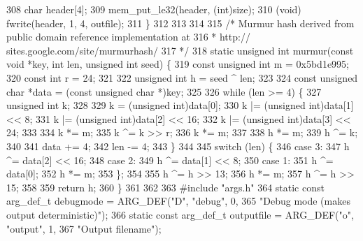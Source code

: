\begin{DoxyCodeInclude}
{{308   \textcolor{keywordtype}{char}             header[4];
309   mem\_put\_le32(header, (\textcolor{keywordtype}{int})size);
310   (void) fwrite(header, 1, 4, outfile);
311 \}
312 
313 
314 
315 \textcolor{comment}{/* Murmur hash derived from public domain reference implementation at}
316 \textcolor{comment}{ *   http:// sites.google.com/site/murmurhash/}
317 \textcolor{comment}{ */}
318 \textcolor{keyword}{static} \textcolor{keywordtype}{unsigned} \textcolor{keywordtype}{int} murmur(\textcolor{keyword}{const} \textcolor{keywordtype}{void} *key, \textcolor{keywordtype}{int} len, \textcolor{keywordtype}{unsigned} \textcolor{keywordtype}{int} seed) \{
319   \textcolor{keyword}{const} \textcolor{keywordtype}{unsigned} \textcolor{keywordtype}{int} m = 0x5bd1e995;
320   \textcolor{keyword}{const} \textcolor{keywordtype}{int} r = 24;
321 
322   \textcolor{keywordtype}{unsigned} \textcolor{keywordtype}{int} h = seed ^ len;
323 
324   \textcolor{keyword}{const} \textcolor{keywordtype}{unsigned} \textcolor{keywordtype}{char} *data = (\textcolor{keyword}{const} \textcolor{keywordtype}{unsigned} \textcolor{keywordtype}{char} *)key;
325 
326   \textcolor{keywordflow}{while} (len >= 4) \{
327     \textcolor{keywordtype}{unsigned} \textcolor{keywordtype}{int} k;
328 
329     k  = (\textcolor{keywordtype}{unsigned} int)data[0];
330     k |= (\textcolor{keywordtype}{unsigned} int)data[1] << 8;
331     k |= (\textcolor{keywordtype}{unsigned} int)data[2] << 16;
332     k |= (\textcolor{keywordtype}{unsigned} int)data[3] << 24;
333 
334     k *= m;
335     k ^= k >> r;
336     k *= m;
337 
338     h *= m;
339     h ^= k;
340 
341     data += 4;
342     len -= 4;
343   \}
344 
345   \textcolor{keywordflow}{switch} (len) \{
346     \textcolor{keywordflow}{case} 3:
347       h ^= data[2] << 16;
348     \textcolor{keywordflow}{case} 2:
349       h ^= data[1] << 8;
350     \textcolor{keywordflow}{case} 1:
351       h ^= data[0];
352       h *= m;
353   \};
354 
355   h ^= h >> 13;
356   h *= m;
357   h ^= h >> 15;
358 
359   \textcolor{keywordflow}{return} h;
360 \}
361 
362 
363 \textcolor{preprocessor}{#include "args.h"}
364 \textcolor{keyword}{static} \textcolor{keyword}{const} arg\_def\_t debugmode = ARG\_DEF(\textcolor{stringliteral}{"D"}, \textcolor{stringliteral}{"debug"}, 0,
365                                            \textcolor{stringliteral}{"Debug mode (makes output deterministic)"});
366 \textcolor{keyword}{static} \textcolor{keyword}{const} arg\_def\_t outputfile = ARG\_DEF(\textcolor{stringliteral}{"o"}, \textcolor{stringliteral}{"output"}, 1,
367                                             \textcolor{stringliteral}{"Output filename"});
}}
\end{DoxyCodeInclude}
